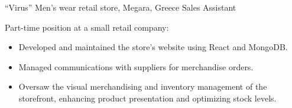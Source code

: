 {“Virus” Men’s wear retail store, Megara, Greece}
{Sales Assistant}
{
    Part-time position at a small retail company:
    \begin{itemize}
        \item Developed and maintained the store’s website using React and MongoDB.
        \item Managed communications with suppliers for merchandise orders.
        \item Oversaw the visual merchandising and inventory management of the storefront, enhancing product presentation and optimizing stock levels.
    \end{itemize}
}

